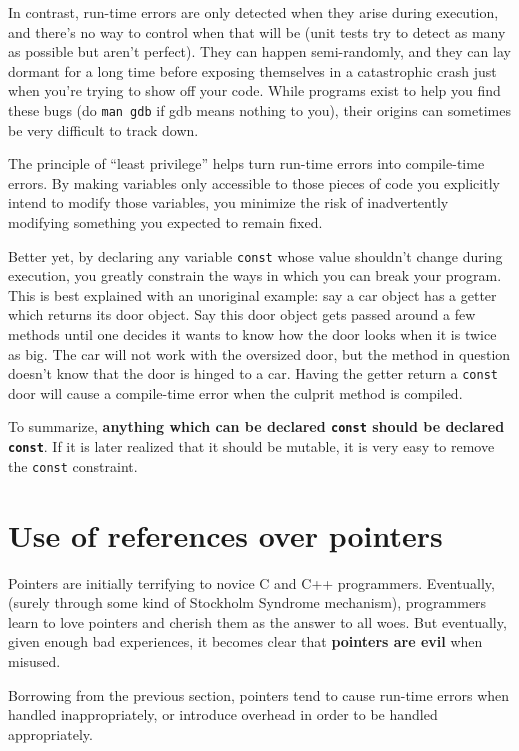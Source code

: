 \documentclass[10pt,a4paper]{book}
\begin{document}
In contrast, run-time errors are only detected when they arise during execution, and there's no way to control when that will be (unit tests try to detect as many as possible but aren't perfect). They can happen semi-randomly, and they can lay dormant for a long time before exposing themselves in a catastrophic crash just when you're trying to show off your code. While programs exist to help you find these bugs (do \Verb`man gdb` if gdb means nothing to you), their origins can sometimes be very difficult to track down.

The principle of ``least privilege'' helps turn run-time errors into compile-time errors. By making variables only accessible to those pieces of code you explicitly intend to modify those variables, you minimize the risk of inadvertently modifying something you expected to remain fixed.

Better yet, by declaring any variable \Verb`const` whose value shouldn't change during execution, you greatly constrain the ways in which you can break your program. This is best explained with an unoriginal example: say a car object has a getter which returns its door object. Say this door object gets passed around a few methods until one decides it wants to know how the door looks when it is twice as big. The car will not work with the oversized door, but the method in question doesn't know that the door is hinged to a car. Having the getter return a \Verb`const` door will cause a compile-time error when the culprit method is compiled.

To summarize, \textbf{anything which can be declared \Verb`const` should be declared \Verb`const`}. If it is later realized that it should be mutable, it is very easy to remove the \Verb`const` constraint.

\section{Use of references over pointers}

Pointers are initially terrifying to novice C and C++ programmers. Eventually, (surely through some kind of Stockholm Syndrome mechanism), programmers learn to love pointers and cherish them as the answer to all woes. But eventually, given enough bad experiences, it becomes clear that \textbf{pointers are evil} when misused.

Borrowing from the previous section, pointers tend to cause run-time errors when handled inappropriately, or introduce overhead in order to be handled appropriately.
\end{document}

